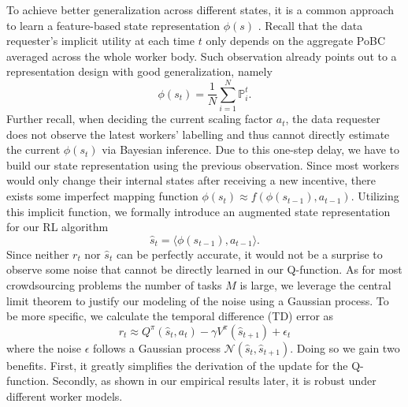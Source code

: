 To achieve better generalization across different states, it is a common approach to learn a feature-based state representation $\phi(s)$ \citep{Gordon00, Mnih15, Liang16}. Recall that the data requester's implicit utility at each time $t$ only depends on the aggregate PoBC averaged across the whole worker body. Such observation already points out to a  representation design with good generalization, namely 
$$\phi(s_t) = \frac{1}{N}\sum_{i=1}^N \mathbb{P}^t_i.$$
Further recall, when deciding the current scaling factor $a_t$, the data requester does not observe the latest workers' labelling and thus cannot directly estimate the current $\phi(s_t)$ via Bayesian inference. Due to this one-step delay, we have to build our state representation using the previous observation. Since most workers would only change their internal states after receiving a new incentive, there exists some imperfect mapping function $\phi(s_{t}) \approx f(\phi(s_{t-1}),a_{t-1})$. %
Utilizing this implicit function, we formally introduce an augmented state representation for our RL algorithm
$$
\hat{s}_t = \langle \phi(s_{t-1}), a_{t-1} \rangle .
$$
Since neither $r_t$ nor $\hat{s}_t$ can be perfectly accurate, it would not be a surprise to observe some noise that cannot be directly learned in our Q-function. %
As for most crowdsourcing problems the number of tasks $M$ is large, we leverage the central limit theorem to justify our modeling of the noise using a Gaussian process.
To be more specific, we calculate the temporal difference (TD) error as 
$$
r_t \approx Q^\pi(\hat{s}_t, a_t) - \gamma V^\pi(\hat{s}_{t+1}) + \epsilon_t $$
where the noise $\epsilon $ follows a Gaussian process $\mathcal{N}(\hat{s}_t,\hat{s}_{t+1})$. Doing so we gain two benefits. First, it greatly simplifies the derivation of the update for the Q-function. Secondly, as shown in our empirical results later, it is robust under different worker models.


